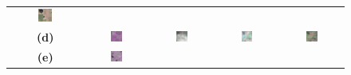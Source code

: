 \begin{figure}[h!]
\begin{tabular}{c *{4}{c}}
        \includegraphics[width=0.2\textwidth, height=0.2\textheight, keepaspectratio]{img/cloud_removal/sample_001114_true_rgb.png} \\
        \textbf{(d)} &
        \includegraphics[width=0.2\textwidth, height=0.2\textheight, keepaspectratio]{img/cloud_removal/sample_000013_sar_pseudo.png} &
        \includegraphics[width=0.2\textwidth, height=0.2\textheight, keepaspectratio]{img/cloud_removal/sample_000013_cloudy_rgb.png} &
        \includegraphics[width=0.2\textwidth, height=0.2\textheight, keepaspectratio]{img/cloud_removal/sample_000013_pred_rgb.png} &
        \includegraphics[width=0.2\textwidth, height=0.2\textheight, keepaspectratio]{img/cloud_removal/sample_000013_true_rgb.png} \\
        \textbf{(e)} &
        \includegraphics[width=0.2\textwidth, height=0.2\textheight, keepaspectratio]{img/cloud_removal/sample_000150_sar_pseudo.png} &

\end{tabular}
\end{figure}
